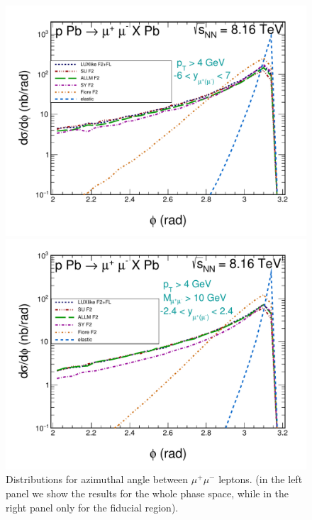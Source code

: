 \begin{figure}[!htbp]
\begin{minipage}{0.47\textwidth}
 \centerline{\includegraphics[width=1.0\textwidth]{figures_Marta/phi.pdf}}
\end{minipage}
\begin{minipage}{0.47\textwidth}
 \centerline{\includegraphics[width=1.0\textwidth]{figures_Marta/phi-c.pdf}}
\end{minipage}
\caption{
Distributions for azimuthal angle between $\mu^+\mu^-$ leptons. (in the left panel we show the results for the whole phase space, while in the right panel only for the fiducial region).
}
\label{fig:dsig_dy}
\end{figure}




